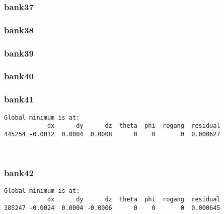 \documentclass[11pt]{article}
\begin{document}
    \hypertarget{bank37}{%
\subsubsection{bank37}\label{bank37}}

    \hypertarget{bank38}{%
\subsubsection{bank38}\label{bank38}}

    \hypertarget{bank39}{%
\subsubsection{bank39}\label{bank39}}

    \hypertarget{bank40}{%
\subsubsection{bank40}\label{bank40}}

    \hypertarget{bank41}{%
\subsubsection{bank41}\label{bank41}}

    \begin{Verbatim}[commandchars=\\\{\}]
Global minimum is at:
            dx      dy      dz  theta  phi  rogang  residual
445254 -0.0012  0.0004  0.0008      0    0       0  0.000627
    \end{Verbatim}

    \begin{center}
    \end{center}
    { \hspace*{\fill} \\}
    
    \hypertarget{bank42}{%
\subsubsection{bank42}\label{bank42}}

    \begin{Verbatim}[commandchars=\\\{\}]
Global minimum is at:
            dx      dy      dz  theta  phi  rogang  residual
385247 -0.0024  0.0004 -0.0006      0    0       0  0.000645
    \end{Verbatim}
\end{document}

